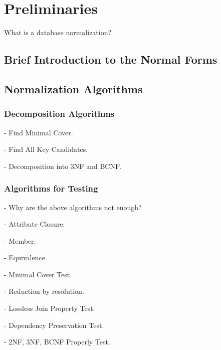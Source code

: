 \chapter{Preliminaries}
\label{chap:preliminaries}
What is a database normalization?
\section{Brief Introduction to the Normal Forms}
\label{sec:nfintro}
\section{Normalization Algorithms}
\label{sec:alg}
\subsection{Decomposition Algorithms}
\label{sec:algdec}
- Find Minimal Cover.

- Find All Key Candidates.

- Decomposition into 3NF and BCNF.

\subsection{Algorithms for Testing}
\label{sec:algtest}
- Why are the above algorithms not enough?

- Attribute Closure.

- Member.

- Equivalence.

- Minimal Cover Test.

- Reduction by resolution.

- Lossless Join Property Test.

- Dependency Preservation Test. 

- 2NF, 3NF, BCNF Properly Test.
